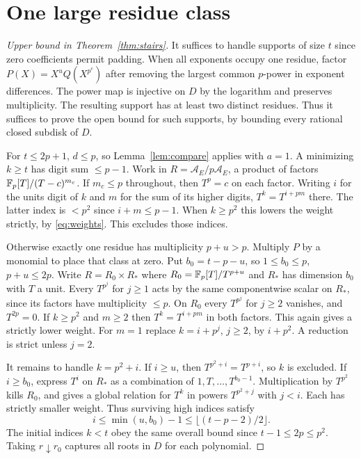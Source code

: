 \documentclass[11pt,letterpaper]{article}
\begin{document}
\section{One large residue class}
\begin{proof}[Upper bound in Theorem~\ref{thm:stairs}]
It suffices to handle supports of size $t$ since zero coefficients permit padding. When all exponents occupy one residue, factor $P(X)=X^uQ(X^{p^e})$ after removing the largest common $p$-power in exponent differences. The power map is injective on $D$ by the logarithm and preserves multiplicity. The resulting support has at least two distinct residues. Thus it suffices to prove the open bound for such supports, by bounding every rational closed subdisk of $D$.

For $t\le2p+1$, $d\le p$, so Lemma~\ref{lem:compare} applies with $a=1$. A minimizing $k\ge t$ has digit sum $\le p-1$. Work in $R=\mathcal A_E/p\mathcal A_E$, a product of factors $\mathbb F_p[T]/(T-c)^{m_c}$. If $m_c\le p$ throughout, then $T^p=c$ on each factor. Writing $i$ for the units digit of $k$ and $m$ for the sum of its higher digits, $T^k=T^{i+pm}$ there. The latter index is $<p^2$ since $i+m\le p-1$. When $k\ge p^2$ this lowers the weight strictly, by \eqref{eq:weights}. This excludes those indices.

Otherwise exactly one residue has multiplicity $p+u>p$. Multiply $P$ by a monomial to place that class at zero. Put $b_0=t-p-u$, so $1\le b_0\le p$, $p+u\le2p$. Write $R=R_0\times R_*$ where $R_0=\mathbb F_p[T]/T^{p+u}$ and $R_*$ has dimension $b_0$ with $T$ a unit. Every $T^{p^j}$ for $j\ge1$ acts by the same componentwise scalar on $R_*$, since its factors have multiplicity $\le p$. On $R_0$ every $T^{p^j}$ for $j\ge2$ vanishes, and $T^{2p}=0$. If $k\ge p^2$ and $m\ge2$ then $T^k=T^{i+pm}$ in both factors. This again gives a strictly lower weight. For $m=1$ replace $k=i+p^j$, $j\ge2$, by $i+p^2$. A reduction is strict unless $j=2$.

It remains to handle $k=p^2+i$. If $i\ge u$, then $T^{p^2+i}=T^{p+i}$, so $k$ is excluded. If $i\ge b_0$, express $T^i$ on $R_*$ as a combination of $1,T,\ldots,T^{b_0-1}$. Multiplication by $T^{p^2}$ kills $R_0$, and gives a global relation for $T^k$ in powers $T^{p^2+j}$ with $j<i$. Each has strictly smaller weight. Thus surviving high indices satisfy
\[
 i\le\min(u,b_0)-1\le \lfloor(t-p-2)/2\rfloor.
\]
The initial indices $k<t$ obey the same overall bound since $t-1\le2p\le p^2$. Taking $r\downarrow r_0$ captures all roots in $D$ for each polynomial.
\end{proof}
\end{document}
